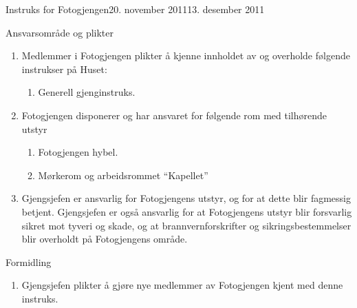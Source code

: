 \documentclass[../fsbok.tex]{subfiles}
\begin{document}
\begin{instruks}{Instruks for Fotogjengen}{20. november 2011}{13. desember 2011}
    \begin{instruksledd}{Ansvarsområde og plikter}
        \begin{enumerate}
            \item Medlemmer i Fotogjengen plikter å kjenne innholdet av og overholde følgende instrukser
                på Huset:
                \begin{enumerate}
                    \item Generell gjenginstruks.
                \end{enumerate}
            \item Fotogjengen disponerer og har ansvaret for følgende rom med tilhørende utstyr
                \begin{enumerate}
                    \item Fotogjengen hybel.
                    \item Mørkerom og arbeidsrommet ``Kapellet''
                \end{enumerate}
            \item Gjengsjefen er ansvarlig for Fotogjengens utstyr, og for at dette blir fagmessig
                betjent. Gjengsjefen er også ansvarlig for at Fotogjengens utstyr blir forsvarlig sikret mot tyveri og skade, og at
                brannvernforskrifter og sikringsbestemmelser blir overholdt på Fotogjengens område.
        \end{enumerate}
    \end{instruksledd}
    
    \begin{instruksledd}{Formidling}
        \begin{enumerate}
            \item Gjengsjefen plikter å gjøre nye medlemmer av Fotogjengen kjent med denne
                instruks.
        \end{enumerate}
    \end{instruksledd}

\end{instruks}
\end{document}
